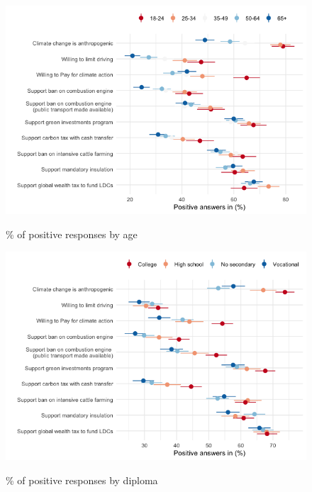 	\begin{frame}{}%
	\begin{figure}[h!]
	\caption{\% of positive responses by age}
	\includegraphics[width=.7\paperwidth]{../figures/FR/positive_all_by_age_FR.png} \\
	\end{figure}
	\end{frame}
	
	\begin{frame}{}%
	\begin{figure}[h!]
	\caption{\% of positive responses by diploma}
	\includegraphics[width=.7\paperwidth]{../figures/FR/positive_all_by_diploma_FR.png} \\
	\end{figure}
	\end{frame}
	
